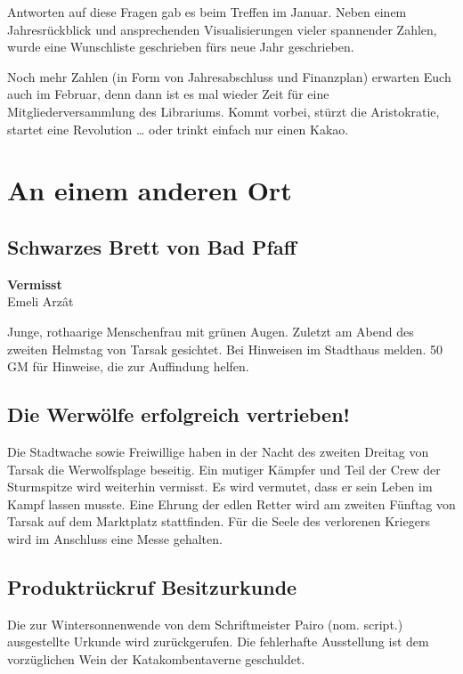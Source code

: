Antworten auf diese Fragen gab es beim Treffen im Januar.
Neben einem Jahresrückblick und ansprechenden Visualisierungen vieler spannender Zahlen, wurde eine Wunschliste geschrieben fürs neue Jahr geschrieben.

Noch mehr Zahlen (in Form von Jahresabschluss und Finanzplan) erwarten Euch auch im Februar, denn dann ist es mal wieder Zeit für eine Mitgliederversammlung des Librariums.
Kommt vorbei, stürzt die Aristokratie, startet eine Revolution … oder trinkt einfach nur einen Kakao.


\section{An einem anderen Ort}
\setsubsubsecheadstyle{\centering\bfseries}

\subsection{Schwarzes Brett von Bad Pfaff}
\begin{center}
    \textbf{Vermisst} \\
    Emeli Arzât
\end{center}
\vspace{-1.5em}
\noindent
Junge, rothaarige Menschenfrau mit grünen Augen.
Zuletzt am Abend des zweiten Helmstag von Tarsak gesichtet.
Bei Hinweisen im Stadthaus melden.
50 GM für Hinweise, die zur Auffindung helfen.


\subsection{Die Werwölfe erfolgreich vertrieben!}

Die Stadtwache sowie Freiwillige haben in der Nacht des zweiten Dreitag von Tarsak die Werwolfsplage beseitig. Ein mutiger Kämpfer und Teil der Crew der Sturmspitze wird weiterhin vermisst. Es wird vermutet, dass er sein Leben im Kampf lassen musste.
Eine Ehrung der edlen Retter wird am zweiten Fünftag von Tarsak auf dem Marktplatz stattfinden. Für die Seele des verlorenen Kriegers wird im Anschluss eine Messe gehalten.


\subsection{Produktrückruf Besitzurkunde}
Die zur Wintersonnenwende von dem Schriftmeister Pairo (nom. script.) ausgestellte Urkunde wird zurückgerufen.
Die fehlerhafte Ausstellung ist dem vorzüglichen Wein der Katakombentaverne geschuldet.

